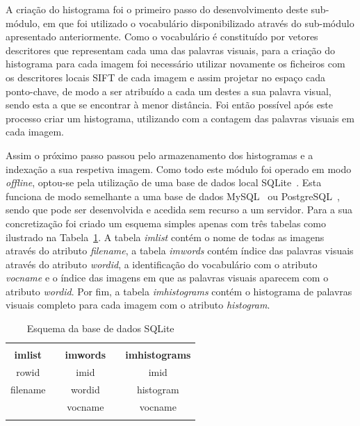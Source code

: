 A criação do histograma foi o primeiro passo do desenvolvimento deste sub-módulo, em que foi utilizado o vocabulário disponibilizado através do sub-módulo apresentado anteriormente. Como o vocabulário é constituído por vetores descritores que representam cada uma das palavras visuais, para a criação do histograma para cada imagem foi necessário utilizar novamente os ficheiros com os descritores locais SIFT de cada imagem e assim projetar no espaço cada ponto-chave, de modo a ser atribuído a cada um destes a sua palavra visual, sendo esta a que se encontrar à menor distância. Foi então possível após este processo criar um histograma, utilizando  com a contagem das palavras visuais em cada imagem.

Assim o próximo passo passou pelo armazenamento dos histogramas e a indexação a sua respetiva imagem. Como todo este módulo foi operado em modo \textit{offline}, optou-se pela utilização de uma base de dados local SQLite~\cite{sqlite}. Esta funciona de modo semelhante a uma base de dados MySQL~\cite{mysql} ou PostgreSQL~\cite{postgresql}, sendo que pode ser desenvolvida e acedida sem recurso a um servidor. Para a sua concretização foi criado um esquema simples apenas com três tabelas como ilustrado na Tabela~\ref{tab:schemadb}. A tabela \textit{imlist} contém o nome de todas as imagens através do atributo \textit{filename}, a tabela \textit{imwords} contém índice das palavras visuais através do atributo \textit{wordid}, a identificação do vocabulário com o atributo \textit{vocname} e o índice das imagens em que as palavras visuais aparecem com o atributo \textit{wordid}. Por fim, a tabela \textit{imhistograms} contém o histograma de palavras visuais completo para cada imagem com o atributo \textit{histogram}.

\begin{table}[h]
\centering
\begin{tabular}{lcccc}
\multicolumn{5}{l}{} \\ \cline{1-1} \cline{3-3} \cline{5-5} 
\multicolumn{1}{|c|}{\cellcolor[HTML]{C0C0C0}\textbf{imlist}} & \multicolumn{1}{c|}{} & \multicolumn{1}{c|}{\cellcolor[HTML]{C0C0C0}\textbf{imwords}} & \multicolumn{1}{c|}{} & \multicolumn{1}{c|}{\cellcolor[HTML]{C0C0C0}\textbf{imhistograms}} \\ \cline{1-1} \cline{3-3} \cline{5-5} 
\multicolumn{1}{|c|}{rowid} & \multicolumn{1}{c|}{} & \multicolumn{1}{c|}{imid} & \multicolumn{1}{c|}{} & \multicolumn{1}{c|}{imid} \\ \cline{1-1} \cline{3-3} \cline{5-5} 
\multicolumn{1}{|c|}{filename} & \multicolumn{1}{c|}{\multirow{-3}{*}{}} & \multicolumn{1}{c|}{wordid} & \multicolumn{1}{c|}{} & \multicolumn{1}{c|}{histogram} \\ \cline{1-1} \cline{3-3} \cline{5-5} 
 & \multicolumn{1}{l|}{} & \multicolumn{1}{c|}{vocname} & \multicolumn{1}{c|}{\multirow{-4}{*}{}} & \multicolumn{1}{c|}{vocname} \\ \cline{3-3} \cline{5-5} 
\multicolumn{5}{l}{}
\end{tabular}
\caption{Esquema da base de dados SQLite}
\label{tab:schemadb}
\end{table}


